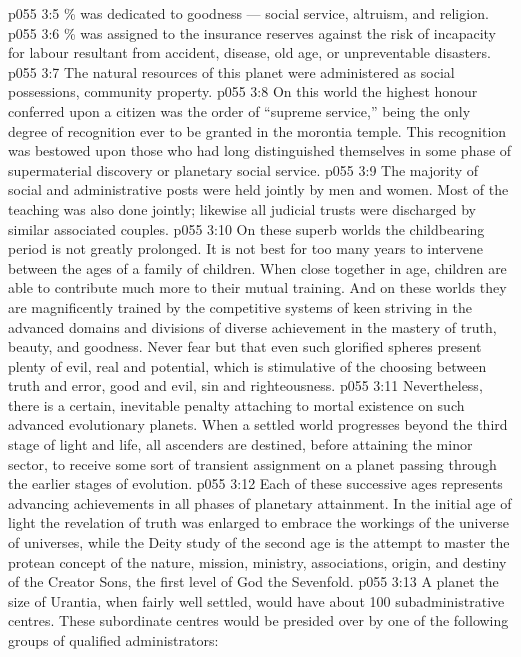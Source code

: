 \vs p055 3:5 \% was dedicated to goodness --- social service, altruism, and religion.
\vs p055 3:6 \% was assigned to the insurance reserves against the risk of incapacity for labour resultant from accident, disease, old age, or unpreventable disasters.
\vs p055 3:7 \pc The natural resources of this planet were administered as social possessions, community property.
\vs p055 3:8 On this world the highest honour conferred upon a citizen was the order of “supreme service,” being the only degree of recognition ever to be granted in the morontia temple. This recognition was bestowed upon those who had long distinguished themselves in some phase of supermaterial discovery or planetary social service.
\vs p055 3:9 The majority of social and administrative posts were held jointly by men and women. Most of the teaching was also done jointly; likewise all judicial trusts were discharged by similar associated couples.
\vs p055 3:10 \pc On these superb worlds the childbearing period is not greatly prolonged. It is not best for too many years to intervene between the ages of a family of children. When close together in age, children are able to contribute much more to their mutual training. And on these worlds they are magnificently trained by the competitive systems of keen striving in the advanced domains and divisions of diverse achievement in the mastery of truth, beauty, and goodness. Never fear but that even such glorified spheres present plenty of evil, real and potential, which is stimulative of the choosing between truth and error, good and evil, sin and righteousness.
\vs p055 3:11 Nevertheless, there is a certain, inevitable penalty attaching to mortal existence on such advanced evolutionary planets. When a settled world progresses beyond the third stage of light and life, all ascenders are destined, before attaining the minor sector, to receive some sort of transient assignment on a planet passing through the earlier stages of evolution.
\vs p055 3:12 Each of these successive ages represents advancing achievements in all phases of planetary attainment. In the initial age of light the revelation of truth was enlarged to embrace the workings of the universe of universes, while the Deity study of the second age is the attempt to master the protean concept of the nature, mission, ministry, associations, origin, and destiny of the Creator Sons, the first level of God the Sevenfold.
\vs p055 3:13 \pc A planet the size of Urantia, when fairly well settled, would have about 100 subadministrative centres. These subordinate centres would be presided over by one of the following groups of qualified administrators:
